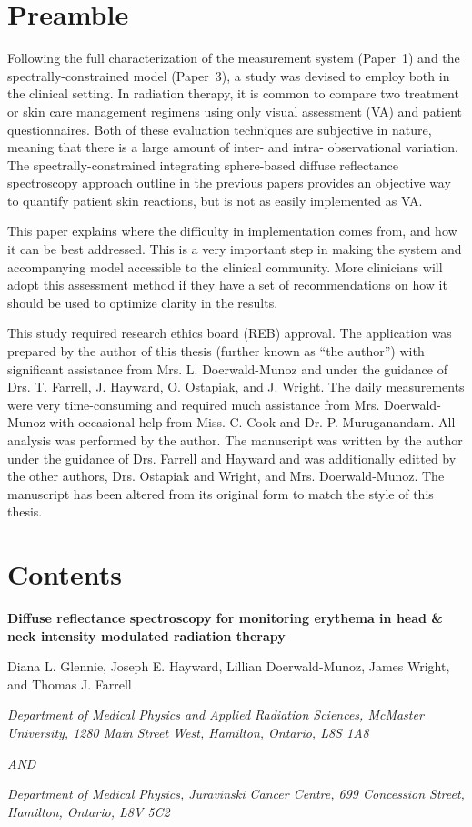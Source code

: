 \label{chap:p4-imrt_study}
\section*{Preamble}
Following the full characterization of the measurement system (Paper~1) and the spectrally-constrained model (Paper~3), a study was devised to employ both in the clinical setting. In radiation therapy, it is common to compare two treatment or skin care management regimens using only visual assessment (VA) and patient questionnaires. Both of these evaluation techniques are subjective in nature, meaning that there is a large amount of inter- and intra- observational variation. The spectrally-constrained integrating sphere-based diffuse reflectance spectroscopy approach outline in the previous papers provides an objective way to quantify patient skin reactions, but is not as easily implemented as VA.

This paper explains where the difficulty in implementation comes from, and how it can be best addressed. This is a very important step in making the system and accompanying model accessible to the clinical community. More clinicians will adopt this assessment method if they have a set of recommendations on how it should be used to optimize clarity in the results.

This study required research ethics board (REB) approval. The application was prepared by the author of this thesis (further known as ``the author'') with significant assistance from Mrs. L. Doerwald-Munoz and under the guidance of Drs. T. Farrell, J. Hayward, O. Ostapiak, and J. Wright. The daily measurements were very time-consuming and required much assistance from Mrs. Doerwald-Munoz with occasional help from Miss. C. Cook and Dr. P. Muruganandam. All analysis was performed by the author. The manuscript was written by the author under the guidance of Drs. Farrell and Hayward and was additionally editted by the other authors, Drs. Ostapiak and Wright, and Mrs. Doerwald-Munoz. The manuscript has been altered from its original form to match the style of this thesis.

\section*{Contents}

\begin{center}
	
	\textbf{Diffuse reflectance spectroscopy for monitoring erythema in head \& neck intensity modulated radiation therapy}
	
	Diana L. Glennie, Joseph E. Hayward, Lillian Doerwald-Munoz, James Wright, and Thomas J. Farrell
	
	\textit{Department of Medical Physics and Applied Radiation Sciences, McMaster University, 1280 Main Street West, Hamilton, Ontario, L8S 1A8}
	
	\textit{AND}
	
	\textit{Department of Medical Physics, Juravinski Cancer Centre, 699 Concession Street, Hamilton, Ontario, L8V 5C2}
	
\end{center}

